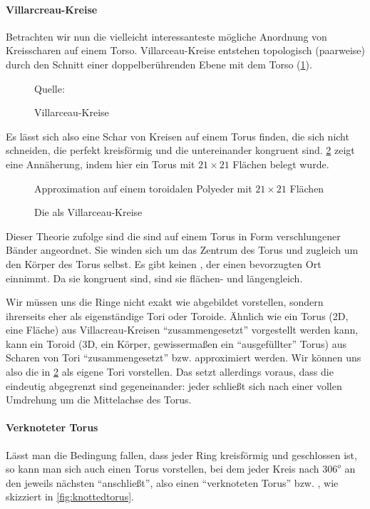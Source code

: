 \paragraph{Villarcreau-Kreise}
Betrachten wir nun die vielleicht interessanteste mögliche Anordnung von Kreisscharen auf einem Torso. Villarceau-Kreise  entstehen topologisch (paarweise) durch den Schnitt einer doppelberührenden Ebene mit dem Torso (\cref{fig:villarceaukreise}).

\begin{figure}[ht!]
    \centering
    
    \caption{Villarceau-Kreise} Quelle:  \cite{villarceauag2gaeh}
    \label{fig:villarceaukreise}
\end{figure}

Es lässt sich also eine Schar von Kreisen auf einem Torus finden, die sich nicht schneiden, die perfekt kreisförmig und die untereinander kongruent sind. \cref{fig:villarceautorous} zeigt eine Annäherung, indem hier ein Torus mit $21\times 21$ Flächen belegt wurde.

\begin{figure}[ht!] 
    \centering
                        
    \caption{Die  als Villarceau-Kreise} Approximation auf einem toroidalen Polyeder mit $21\times21$ Flächen
    \label{fig:villarceautorous}
\end{figure}


Dieser Theorie zufolge sind die  sind auf einem Torus in Form verschlungener Bänder angeordnet. Sie winden sich um das Zentrum des Torus und zugleich um den Körper des Torus selbst. 
Es gibt keinen , der einen bevorzugten Ort einnimmt. Da sie kongruent sind, sind sie flächen- und längengleich.


Wir müssen uns die Ringe nicht exakt wie abgebildet vorstellen, sondern ihrerseits eher als eigenständige Tori oder Toroide. Ähnlich wie ein Torus (2D, eine Fläche) aus Vil\-lac\-reau-Kreisen "`zusammengesetzt"' vorgestellt werden kann, kann ein Toroid (3D, ein Körper, gewissermaßen ein "`ausgefüllter"' Torus) aus Scharen von Tori "`zusammengesetzt"' bzw. approximiert werden. 
Wir können uns also die  in \cref{fig:villarceautorous} als eigene Tori vorstellen.
Das setzt allerdings voraus, dass die  eindeutig abgegrenzt sind gegeneinander: jeder  schließt sich nach einer vollen Umdrehung um die Mittelachse des Torus. 

\paragraph{Verknoteter Torus}
Lässt man die Bedingung fallen, dass jeder Ring kreisförmig und geschlossen ist, so kann man sich auch einen Torus vorstellen, bei dem jeder Kreis nach $306^o$ an den jeweils nächsten "`anschließt"', also einen "`verknoteten Torus"' bzw. , wie skizziert in \cref{fig:knottedtorus}.

